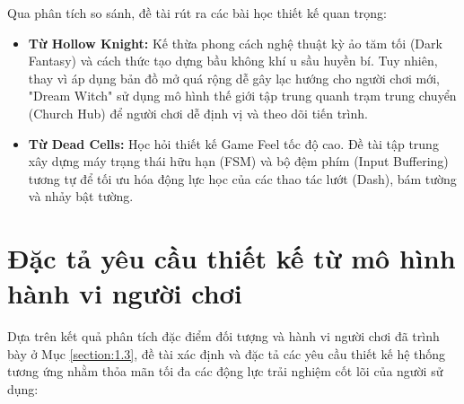 \documentclass[../DoAn.tex]{subfiles}
\begin{document}
Qua phân tích so sánh, đề tài rút ra các bài học thiết kế quan trọng:
\begin{itemize}
    \item \textbf{Từ Hollow Knight:} Kế thừa phong cách nghệ thuật kỳ ảo tăm tối (Dark Fantasy) và cách thức tạo dựng bầu không khí u sầu huyền bí. Tuy nhiên, thay vì áp dụng bản đồ mở quá rộng dễ gây lạc hướng cho người chơi mới, "Dream Witch" sử dụng mô hình thế giới tập trung quanh trạm trung chuyển (Church Hub) để người chơi dễ định vị và theo dõi tiến trình.
    \item \textbf{Từ Dead Cells:} Học hỏi thiết kế Game Feel tốc độ cao. Đề tài tập trung xây dựng máy trạng thái hữu hạn (FSM) và bộ đệm phím (Input Buffering) tương tự để tối ưu hóa động lực học của các thao tác lướt (Dash), bám tường và nhảy bật tường.
\end{itemize}


\section{Đặc tả yêu cầu thiết kế từ mô hình hành vi người chơi}
\label{section:2.2}

Dựa trên kết quả phân tích đặc điểm đối tượng và hành vi người chơi đã trình bày ở Mục \ref{section:1.3}, đề tài xác định và đặc tả các yêu cầu thiết kế hệ thống tương ứng nhằm thỏa mãn tối đa các động lực trải nghiệm cốt lõi của người sử dụng:
\end{document}
